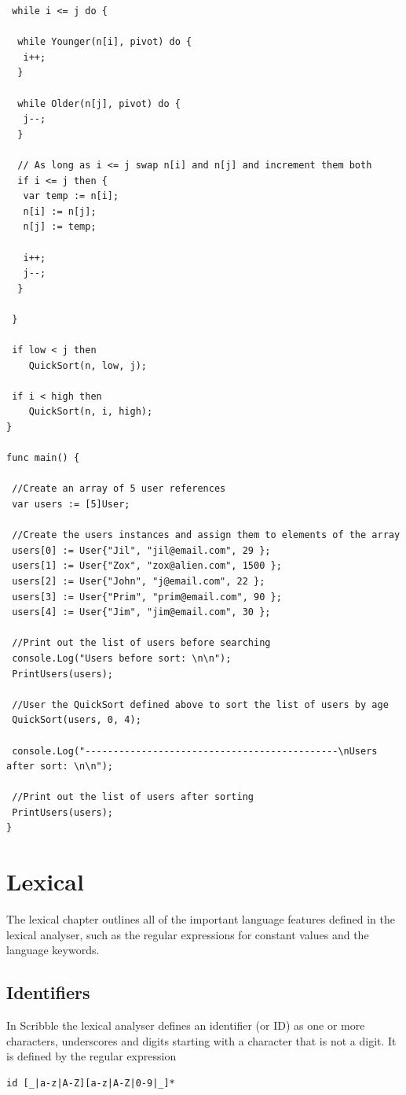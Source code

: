 \documentclass[]{final_report}
\begin{document}
\begin{verbatim}
 while i <= j do {

  while Younger(n[i], pivot) do {
   i++;
  }
  
  while Older(n[j], pivot) do {
   j--;
  }

  // As long as i <= j swap n[i] and n[j] and increment them both
  if i <= j then {
   var temp := n[i];
   n[i] := n[j];
   n[j] := temp;
   
   i++;
   j--;
  }

 }
 
 if low < j then 
 	QuickSort(n, low, j);
 
 if i < high then 
 	QuickSort(n, i, high);
}

func main() {

 //Create an array of 5 user references
 var users := [5]User;
 
 //Create the users instances and assign them to elements of the array
 users[0] := User{"Jil", "jil@email.com", 29 };
 users[1] := User{"Zox", "zox@alien.com", 1500 };
 users[2] := User{"John", "j@email.com", 22 };
 users[3] := User{"Prim", "prim@email.com", 90 };
 users[4] := User{"Jim", "jim@email.com", 30 };
 
 //Print out the list of users before searching
 console.Log("Users before sort: \n\n");
 PrintUsers(users);

 //User the QuickSort defined above to sort the list of users by age
 QuickSort(users, 0, 4);
 
 console.Log("---------------------------------------------\nUsers after sort: \n\n");
 
 //Print out the list of users after sorting
 PrintUsers(users);
}
\end{verbatim}

\section{Lexical}

The lexical chapter outlines all of the important language features defined in the lexical analyser, such as the regular expressions for constant values and the language keywords.

\subsection{Identifiers}

In Scribble the lexical analyser defines an identifier (or ID) as one or more characters, underscores and digits starting with a character that is not a digit. It is defined by the regular expression
\begin{verbatim}
id [_|a-z|A-Z][a-z|A-Z|0-9|_]*
\end{verbatim}
\end{document}
